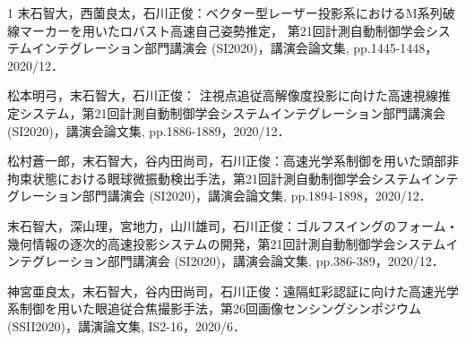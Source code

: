 \begin{発表}{1}
末石智大，西薗良太，石川正俊：ベクター型レーザー投影系におけるM系列破線マーカーを用いたロバスト高速自己姿勢推定， 第21回計測自動制御学会システムインテグレーション部門講演会 (SI2020)，講演会論文集, pp.1445-1448，2020/12．

松本明弓，末石智大，石川正俊： 注視点追従高解像度投影に向けた高速視線推定システム，第21回計測自動制御学会システムインテグレーション部門講演会 (SI2020)，講演会論文集, pp.1886-1889，2020/12．

松村蒼一郎，末石智大，谷内田尚司，石川正俊：高速光学系制御を用いた頭部非拘束状態における眼球微振動検出手法，第21回計測自動制御学会システムインテグレーション部門講演会 (SI2020)，講演会論文集, pp.1894-1898，2020/12．

末石智大，深山理，宮地力，山川雄司，石川正俊：ゴルフスイングのフォーム・幾何情報の逐次的高速投影システムの開発，第21回計測自動制御学会システムインテグレーション部門講演会 (SI2020)，講演会論文集, pp.386-389，2020/12．

神宮亜良太，末石智大，谷内田尚司，石川正俊：遠隔虹彩認証に向けた高速光学系制御を用いた眼追従合焦撮影手法，第26回画像センシングシンポジウム (SSII2020)，講演論文集, IS2-16，2020/6．


\end{発表}